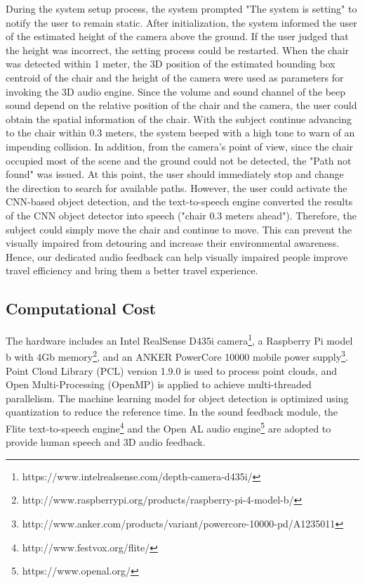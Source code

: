 \documentclass{ieeeaccess}
\begin{document}
During the system setup process, the system prompted "The system is setting" to notify the user to remain static. After initialization, the system informed the user of the estimated height of the camera above the ground. If the user judged that the height was incorrect, the setting process could be restarted. When the chair was detected within 1 meter, the 3D position of the estimated bounding box centroid of the chair and the height of the camera were used as parameters for invoking the 3D audio engine. Since the volume and sound channel of the beep sound depend on the relative position of the chair and the camera, the user could obtain the spatial information of the chair. With the subject continue advancing to the chair within 0.3 meters, the system beeped with a high tone to warn of an impending collision. In addition, from the camera's point of view, since the chair occupied most of the scene and the ground could not be detected, the "Path not found" was issued. At this point, the user should immediately stop and change the direction to search for available paths. However, the user could activate the CNN-based object detection, and the text-to-speech engine converted the results of the CNN object detector into speech ("chair 0.3 meters ahead"). Therefore, the subject could simply move the chair and continue to move. This can prevent the visually impaired from detouring and increase their environmental awareness. Hence, our dedicated audio feedback can help visually impaired people improve travel efficiency and bring them a better travel experience.



\subsection{Computational Cost}

The hardware includes an Intel RealSense D435i camera\footnote{https://www.intelrealsense.com/depth-camera-d435i/}, a Raspberry Pi model b with 4Gb memory\footnote{http://www.raspberrypi.org/products/raspberry-pi-4-model-b/}, and an ANKER PowerCore 10000 mobile power supply\footnote{http://www.anker.com/products/variant/powercore-10000-pd/A1235011}. Point Cloud Library (PCL) version 1.9.0 is used to process point clouds, and Open Multi-Processing (OpenMP) is applied to achieve multi-threaded parallelism. The machine learning model for object detection is optimized using quantization to reduce the reference time. In the sound feedback module, the Flite text-to-speech engine\footnote{http://www.festvox.org/flite/} and the Open AL audio engine\footnote{https://www.openal.org/} are adopted to provide human speech and 3D audio feedback.
\end{document}
